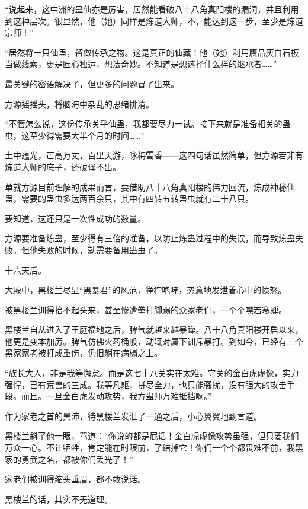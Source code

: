 
\begin{this_body}

“说起来，这中洲的蛊仙亦是厉害，居然能看破八十八角真阳楼的漏洞，并且利用到这种层次。很显然，他（她）同样是炼道大师，不，能达到这一步，至少是炼道宗师！”

“居然将一只仙蛊，留做传承之物。这是真正的仙藏！他（她）利用赝品灰白石板当做线索，更是匠心独运，想法奇妙。不知道是想选择什么样的继承者……”

最关键的密语解决了，但更多的问题冒了出来。

方源摇摇头，将脑海中杂乱的思绪排清。

“不管怎么说，这份传承关乎仙蛊，我都要尽力一试。接下来就是准备相关的蛊虫，这至少得需要大半个月的时间……”

土中蕴光，芒高万丈，百里天游，咏梅雪香——这四句话虽然简单，但方源若非有炼道大师的底子，还破译不出。

单就方源目前理解的成果而言，要借助八十八角真阳楼的伟力回流，炼成神秘仙蛊，需要的蛊虫多达两百余只，其中有四转五转蛊虫就有二十八只。

要知道，这还只是一次性成功的数量。

方源要准备炼蛊，至少得有三倍的准备，以防止炼蛊过程中的失误，而导致炼蛊失败。但他失败的时候，就需要备用蛊虫了。

十六天后。

大殿中，黑楼兰尽显“黑暴君”的风范，狰狞咆哮，恣意地发泄着心中的愤怒。

被黑楼兰训得抬不起头来，甚至惨遭拳打脚踢的众家老们，一个个噤若寒蝉。

黑楼兰自从进入了王庭福地之后，脾气就越来越暴躁。八十八角真阳楼开启以来，他更是变本加厉。脾气仿佛火药桶般，动辄对属下训斥暴打。到如今，已经有三个黑家家老被打成重伤，仍旧躺在病榻之上。

“族长大人，非是我等懈怠。而是这七十八关实在太难。守关的金白虎虚像，实力强悍，已有荒兽的三成。我等凡躯，拼尽全力，也只能骚扰，没有强大的攻击手段。而且。一旦金白虎发动攻势，我方蛊师万难抵挡啊。”

作为家老之首的黑沛，待黑楼兰发泄了一通之后，小心翼翼地觐言道。

黑楼兰斜了他一眼，骂道：“你说的都是屁话！金白虎虚像攻势虽强，但只要我们万众一心。不计牺牲，肯定能在时限前，了结掉它！你们一个个都畏难不前，我黑家的勇武之名，都被你们丢光了！”

家老们被训得缩头垂眉，都不敢说话。

黑楼兰的话，其实不无道理。


\end{this_body}
